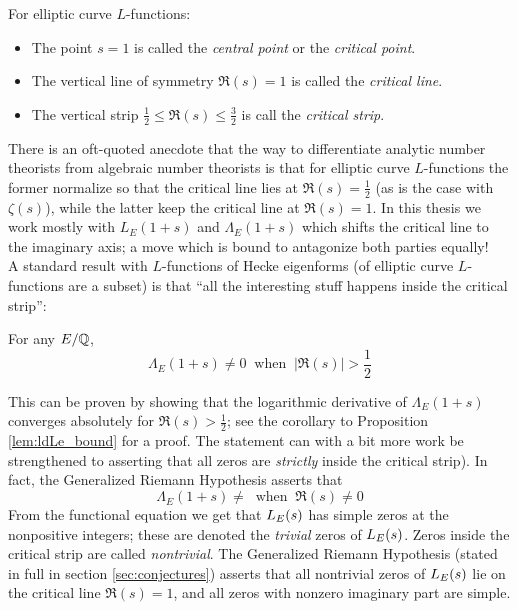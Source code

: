 \begin{definition} For elliptic curve $L$-functions:
\begin{itemize}
\item The point $s=1$ is called the {\it central point} or the {\it critical point}.
\item The vertical line of symmetry $\Re(s)=1$ is called the {\it critical line}.
\item The vertical strip $\frac{1}{2} \le \Re(s) \le \frac{3}{2}$ is call the {\it critical strip}.
\end{itemize}
\end{definition}

There is an oft-quoted anecdote that the way to differentiate analytic number theorists from algebraic number theorists is that for elliptic curve $L$-functions the former normalize so that the critical line lies at $\Re(s) = \frac{1}{2}$ (as is the case with $\zeta(s)$), while the latter keep the critical line at $\Re(s)=1$. In this thesis we work mostly with $L_E(1+s)$ and $\Lambda_E(1+s)$ which shifts the critical line to the imaginary axis; a move which is bound to antagonize both parties equally! \\

A standard result with $L$-functions of Hecke eigenforms (of elliptic curve $L$-functions are a subset) is that ``all the interesting stuff happens inside the critical strip'':
\begin{proposition}
For any $E/\mathbb{Q}$,
\begin{equation}
\Lambda_E(1+s) \ne 0 \;\;\mbox{when}\;\; |\Re(s)| > \frac{1}{2}
\end{equation}
\end{proposition}
This can be proven by showing that the logarithmic derivative of $\Lambda_E(1+s)$ converges absolutely for $\Re(s) > \frac{1}{2}$; see the corollary to Proposition \ref{lem:ldLe_bound} for a proof. The statement can with a bit more work be strengthened to asserting that all zeros are {\it strictly} inside the critical strip). In fact, the Generalized Riemann Hypothesis asserts that
\begin{equation}
\Lambda_E(1+s) \ne  \;\;\mbox{when}\;\; \Re(s) \neq 0
\end{equation}
From the functional equation we get that $L_E(s)$ has simple zeros at the nonpositive integers; these are denoted the {\it trivial} zeros of $L_E(s)$. Zeros inside the critical strip are called {\it nontrivial}. The Generalized Riemann Hypothesis (stated in full in section \ref{sec:conjectures}) asserts that all nontrivial zeros of $L_E(s)$ lie on the critical line $\Re(s)=1$, and all zeros with nonzero imaginary part are simple. 

